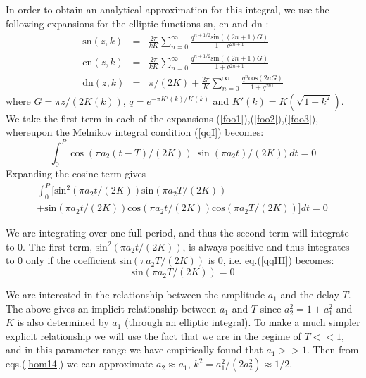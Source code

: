 \documentclass[12pt]{article}
\begin{document}
In order to obtain an analytical approximation for this integral, we use the following expansions for the elliptic functions sn, cn and dn \cite{byrd}:\\
\begin{eqnarray}
\label{foo1}
\text{sn}(z,k)&=&\frac{2\pi}{kK}\sum_{n=0}^\infty\frac{q^{n+1/2}\text{sin}((2n+1)G)}{1-q^{2n+1}}\\
\label{foo2}
\text{cn}(z,k)&=&\frac{2\pi}{kK}\sum_{n=0}^\infty\frac{q^{n+1/2}\text{sin}((2n+1)G)}{1+q^{2n+1}}\\
\label{foo3}
\text{dn}(z,k)&=&\pi/(2K)+\frac{2\pi}{K}\sum_{n=0}^\infty\frac{q^{n}\text{cos}(2nG)}{1+q^{2n1}}
\end{eqnarray}
where  
$G=\pi z/(2K(k))$, $q=e^{-\pi K'(k)/K(k)}$ and $K'(k)=K(\sqrt{1-k^2})$.
We take the first term in each of the expansions (\ref{foo1}),(\ref{foo2}),(\ref{foo3}), whereupon the
Melnikov integral condition (\ref{qqI}) becomes:
\begin{equation}
\label{qqII} 
\int_0^P \cos(\pi a_2(t-T)/(2K))~\sin(\pi a_2t)/(2K))~dt = 0
\end{equation}
Expanding the cosine term gives
\begin{eqnarray}
\nonumber
\int_0^P [\text{sin}^2(\pi a_2 t/(2K))\text{sin}(\pi a_2 T/(2K))~~~~~~~~~~~~~~~~~~~~~~~~~~~~~~~~~~~~~~~~~~~~~~~\\
\label{qqIII} 
 +\text{sin}(\pi a_2 t/(2K))\text{cos}(\pi a_2 t/(2K))\text{cos}(\pi a_2T/(2K))] dt=0 
 \end{eqnarray} 

We are integrating over one full period, and thus the second term will integrate to 0. The first term, $\text{sin}^2(\pi a_2 t/(2K))$, is always positive and thus integrates to 0 only if the coefficient $\text{sin}(\pi a_2 T/(2K))$ is 0, i.e. eq.(\ref{qqIII}) becomes:
\begin{equation}
\label{qqIV} 
\text{sin}(\pi a_2 T/(2K))=0
\end{equation}


We are interested in the relationship between the amplitude $a_1$ and the delay $T$. The above gives an implicit relationship between $a_1$ and $T$ since $a_2^2=1+a_1^2$ and $K$ is  also determined by $a_1$ (through an elliptic integral). To make a much simpler explicit relationship we will use the fact that we are in the regime of $T<<1$, and in this parameter range we have empirically found that $a_1>>1$. Then from eqs.(\ref{hom14}) we can approximate $a_2 \approx a_1$, $k^2=a_1^2/(2a_2^2)\approx 1/2$. 
\end{document}
